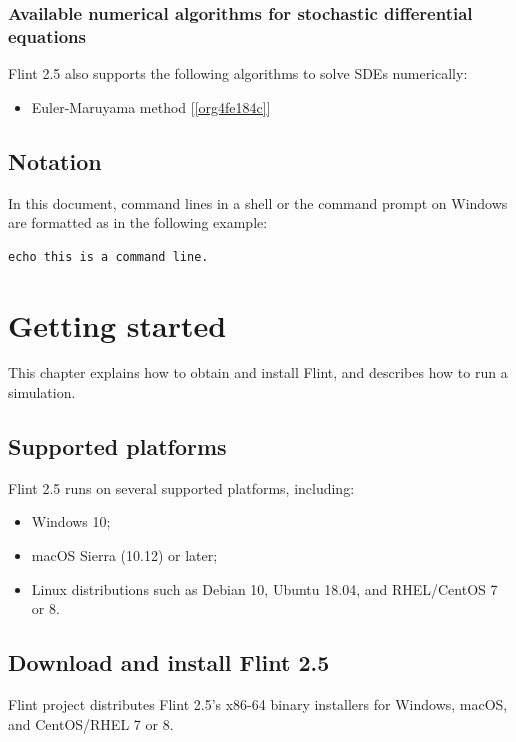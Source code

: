 \documentclass[a4paper,10pt]{report}
\begin{document}
\subsection{Available numerical algorithms for stochastic differential equations}
\label{sec:orgda5c417}
Flint 2.5 also supports the following algorithms to solve SDEs
numerically:

\begin{itemize}
\item Euler-Maruyama method [\ref{org4fe184c}]
\end{itemize}


\section{Notation}
\label{sec:orgd4abbb5}
In this document, command lines in a shell or the command prompt on Windows are
formatted as in the following example:
\begin{verbatim}
echo this is a command line.
\end{verbatim}


\chapter{Getting started}
\label{sec:orgacb2c65}

This chapter explains how to obtain and install Flint, and describes how to run
a simulation.

\section{Supported platforms}
\label{sec:org3e9610c}
Flint 2.5 runs on several supported platforms, including:

\begin{itemize}
\item Windows 10;
\item macOS Sierra (10.12) or later;
\item Linux distributions such as Debian 10, Ubuntu 18.04, and RHEL/CentOS 7 or 8.
\end{itemize}


\section{Download and install Flint 2.5}
\label{sec:org66eb5ad}
Flint project distributes Flint 2.5's x86-64 binary installers for Windows,
macOS, and CentOS/RHEL 7 or 8.
\end{document}
